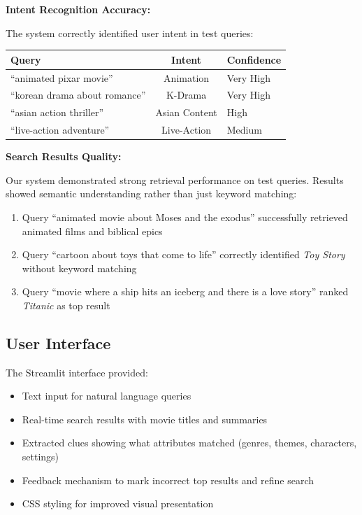 \documentclass[11pt,a4paper]{article}
\begin{document}
\textbf{Intent Recognition Accuracy:}

The system correctly identified user intent in test queries:

\begin{table}[h]
\centering
\begin{tabularx}{\linewidth}{|l|c|l|}
\hline
\textbf{Query} & \textbf{Intent} & \textbf{Confidence} \\
\hline
``animated pixar movie'' & Animation & Very High \\
\hline
``korean drama about romance'' & K-Drama & Very High \\
\hline
``asian action thriller'' & Asian Content & High \\
\hline
``live-action adventure'' & Live-Action & Medium \\
\hline
\end{tabularx}
\end{table}

\textbf{Search Results Quality:}

Our system demonstrated strong retrieval performance on test queries. Results showed semantic understanding rather than just keyword matching:

\begin{enumerate}
    \item Query ``animated movie about Moses and the exodus'' successfully retrieved animated films and biblical epics
    \item Query ``cartoon about toys that come to life'' correctly identified \textit{Toy Story} without keyword matching
    \item Query ``movie where a ship hits an iceberg and there is a love story'' ranked \textit{Titanic} as top result
\end{enumerate}

\subsection{User Interface}

The Streamlit interface provided:

\begin{itemize}
    \item Text input for natural language queries
    \item Real-time search results with movie titles and summaries
    \item Extracted clues showing what attributes matched (genres, themes, characters, settings)
    \item Feedback mechanism to mark incorrect top results and refine search
    \item CSS styling for improved visual presentation
\end{itemize}
\end{document}
